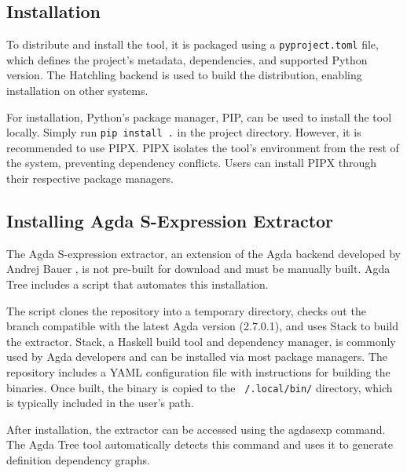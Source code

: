\subsection{Installation} \label{sub:Agda Tree Installation}

To distribute and install the tool, it is packaged using a \texttt{pyproject.toml} file,
which defines the project’s metadata, dependencies, and supported Python
version. The Hatchling backend is used to build the distribution, enabling
installation on other systems. 

For installation, Python's package manager, PIP, can be used to install the
tool locally. Simply run \texttt{pip install .} in the project directory.
However, it is recommended to use PIPX. PIPX isolates the tool’s environment
from the rest of the system, preventing dependency conflicts. Users can install
PIPX through their respective package managers.

\subsection{Installing Agda S-Expression Extractor}


The Agda S-expression extractor, an extension of the Agda backend developed by
Andrej Bauer \cite{andrej}, is not pre-built for download and must be manually
built. Agda Tree includes a script that automates this installation.

The script clones the repository into a temporary directory, checks out the
branch compatible with the latest Agda version (2.7.0.1), and uses Stack to
build the extractor. Stack, a Haskell build tool and dependency manager, is
commonly used by Agda developers and can be installed via most package
managers. The repository includes a YAML configuration file with instructions
for building the binaries. Once built, the binary is copied to the
\texttt{~/.local/bin/} directory, which is typically included in the user's
path.

After installation, the extractor can be accessed using the agdasexp command.
The Agda Tree tool automatically detects this command and uses it to generate
definition dependency graphs.


